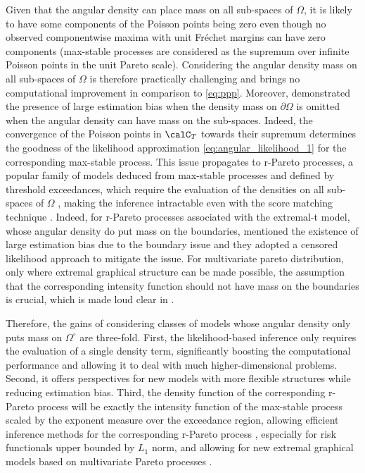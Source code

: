 \documentclass[12pt]{article}
\begin{document}
Given that the angular density can place mass on all sub-spaces of $\Omega$, it is likely to have some components of the Poisson points being zero even though no observed componentwise maxima with unit Fr\'{e}chet margins can have zero components (max-stable processes are considered as the supremum over infinite Poisson points in the unit Pareto scale). Considering the angular density mass on all sub-spaces of $\Omega$ is therefore practically challenging and brings no computational improvement in comparison to \eqref{eq:ppp}. 
Moreover, \cite{Beranger.etal:2017} demonstrated the presence of large estimation bias when the density mass on $\partial\Omega$ is omitted when the angular density can have mass on the sub-spaces. Indeed, the convergence of the Poisson points in $\calC_{T}$ towards their supremum determines the goodness of the likelihood approximation \eqref{eq:angular_likelihood_1} for the corresponding max-stable process. This issue propagates to r-Pareto processes, a popular family of models deduced from max-stable processes and defined by threshold exceedances, which require the evaluation of the densities on all sub-spaces of $\Omega$ \citep{Dombry.Ribatet:2015}, making the inference intractable even with the score matching technique \citep{deFondeville.Davison:2018}. Indeed,  for r-Pareto processes associated with the extremal-t model, whose angular density do put mass on the boundaries, \citet{Thibaud.Opitz:2015} mentioned the existence of large estimation bias due to the boundary issue and they adopted a censored likelihood approach to mitigate the issue. For multivariate pareto distribution, only where extremal graphical structure can be made possible, the assumption that the corresponding intensity function should not have mass on the boundaries is crucial, which is made loud clear in \citet{Engelke.Hitz:2020}.

Therefore, the gains of considering classes of models whose angular density only puts mass on $\Omega^\circ$ are three-fold. First, the likelihood-based inference only requires the evaluation of a single density term, significantly boosting the computational performance and allowing it to deal with much higher-dimensional problems. Second, it offers perspectives for new models with more flexible structures while reducing estimation bias. Third, the density function of the corresponding r-Pareto process will be exactly the intensity function of the max-stable process scaled by the exponent measure over the exceedance region, allowing efficient inference methods for the corresponding r-Pareto process \citep[see][for the Brown-Resnick model]{deFondeville.Davison:2018}, especially for risk functionals upper bounded by $L_1$ norm, and allowing for new extremal graphical models based on multivariate Pareto processes \citep{Engelke.Hitz:2020}. 
\end{document}
